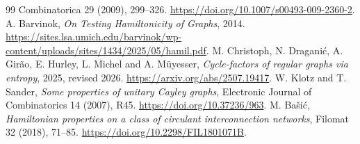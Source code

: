 \documentclass[11pt]{article}
\theoremstyle{remark}
\begin{document}
\begin{thebibliography}{99}
Combinatorica 29 (2009), 299--326.
\url{https://doi.org/10.1007/s00493-009-2360-2}.
A. Barvinok, \emph{On Testing Hamiltonicity of Graphs}, 2014.
\url{https://sites.lsa.umich.edu/barvinok/wp-content/uploads/sites/1434/2025/05/hamil.pdf}.
M. Christoph, N. Dragani\'c, A. Gir\~ao, E. Hurley,
L. Michel and A. M\"uyesser,
\emph{Cycle-factors of regular graphs via entropy}, 2025,
revised 2026. \url{https://arxiv.org/abs/2507.19417}.
W. Klotz and T. Sander, \emph{Some properties of unitary Cayley graphs},
Electronic Journal of Combinatorics 14 (2007), R45.
\url{https://doi.org/10.37236/963}.
M. Ba\v{s}i\'c,
\emph{Hamiltonian properties on a class of circulant interconnection networks},
Filomat 32 (2018), 71--85.
\url{https://doi.org/10.2298/FIL1801071B}.
\end{thebibliography}
\end{document}
